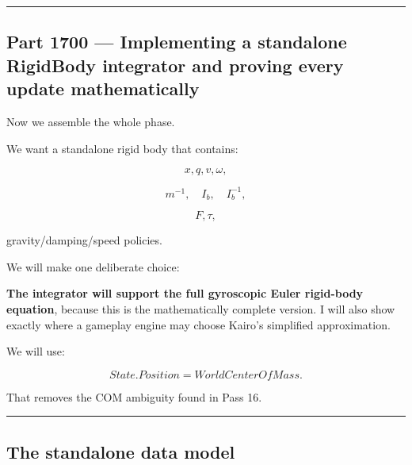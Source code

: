 \begin{center}\rule{0.5\linewidth}{0.5pt}\end{center}

\subsection{Part 1700 --- Implementing a standalone RigidBody integrator and proving every update mathematically}\label{06-engine-ii-ch039-part-1700-implementing-a-standalone-rigidbody-integrator-and-proving-every-update-mathematically}

\hypertarget{06-engine-ii-ch039-part-1700-implementing-a-standalone-rigidbody-integrator-and-proving-every-update-mathematically}{}

Now we assemble the whole phase.

We want a standalone rigid body that contains:

\[
x,q,v,\omega,
\]

\[
m^{-1},
\quad
I_b,
\quad
I_b^{-1},
\]

\[
F,\tau,
\]

gravity/damping/speed policies.

We will make one deliberate choice:

\textbf{The integrator will support the full gyroscopic Euler rigid-body equation}, because this is the mathematically complete version. I will also show exactly where a gameplay engine may choose Kairo's simplified approximation.

We will use:

\[
State.Position
=
WorldCenterOfMass.
\]

That removes the COM ambiguity found in Pass 16.

\begin{center}\rule{0.5\linewidth}{0.5pt}\end{center}

\subsection{The standalone data model}\label{06-engine-ii-ch039-the-standalone-data-model}

\hypertarget{06-engine-ii-ch039-the-standalone-data-model}{}

